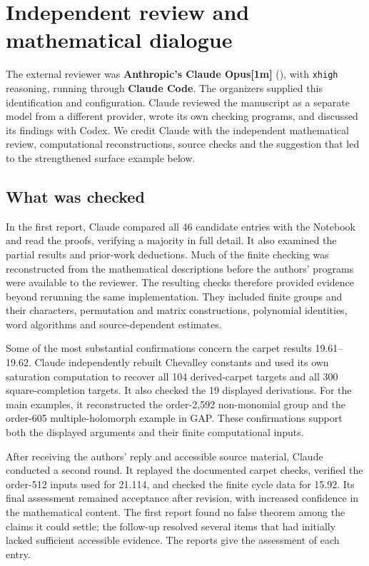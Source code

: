 \section{Independent review and mathematical dialogue}
\label{sec:external-review}

The external reviewer was \textbf{Anthropic's Claude Opus[1m]}
(), with \texttt{xhigh} reasoning, running
through \textbf{Claude Code}. The organizers supplied this identification
and configuration. Claude reviewed the manuscript as a separate model
from a different provider, wrote its own checking programs, and discussed
its findings with Codex. We credit Claude with the independent mathematical
review, computational reconstructions, source checks and the suggestion
that led to the strengthened surface example below.

\subsection{What was checked}

In the first report, Claude compared all 46 candidate entries with the
Notebook and read the proofs, verifying a majority in full detail.
It also examined the partial results and prior-work deductions.
Much of the finite checking was reconstructed from the mathematical
descriptions before the authors' programs were available to the reviewer.
The resulting checks therefore provided evidence beyond rerunning the
same implementation. They included finite groups and their characters,
permutation and matrix constructions, polynomial identities, word
algorithms and source-dependent estimates.

Some of the most substantial confirmations concern the carpet results
19.61--19.62. Claude independently rebuilt Chevalley constants and used
its own saturation computation to recover all 104 derived-carpet targets
and all 300 square-completion targets. It also checked the 19 displayed
derivations. For the main examples, it reconstructed the order-2,592
non-monomial group and the order-605 multiple-holomorph example in GAP.
These confirmations support both the displayed arguments and their
finite computational inputs.

After receiving the authors' reply and accessible source material, Claude
conducted a second round. It replayed the documented carpet checks,
verified the order-512 inputs used for 21.114, and checked the finite
cycle data for 15.92. Its final assessment remained acceptance after
revision, with increased confidence in the mathematical content.
The first report found no false theorem among the claims it could settle;
the follow-up resolved several items that had initially lacked sufficient
accessible evidence. The reports give the assessment of each entry.

